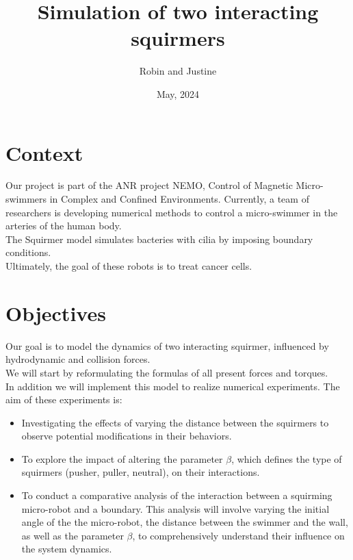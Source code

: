 \documentclass[options]{article}
\begin{document}
\title{Simulation of two interacting squirmers}
\author{Robin and Justine}
\date{May, 2024}
\maketitle

\section{Context}
Our project is part of the ANR project NEMO, Control of Magnetic Micro-swimmers in Complex and Confined Environments.
Currently, a team of researchers is developing numerical methods to control a micro-swimmer in the arteries
of the human body.\\
The Squirmer model simulates bacteries with cilia by imposing boundary conditions.\\
Ultimately, the goal of these robots is to treat cancer cells.\\

\vspace{0.5cm}
\section{Objectives}
Our goal is to model the dynamics of two interacting squirmer, influenced by hydrodynamic \cite{Brumley} and collision forces.\\
We will start by reformulating the formulas of all present forces and torques.\cite{Brumley}\cite{Lauga}\\
In addition we will implement this model to realize numerical experiments. The aim of these experiments is: 
\begin{itemize}
    \item Investigating the effects of varying the distance between the squirmers to observe
    potential modifications in their behaviors.
    \item To explore the impact of altering the parameter $\beta$, which defines the
    type of squirmers (pusher, puller, neutral), on their interactions.
    \item To conduct a comparative analysis of the interaction between a squirming micro-robot and a 
    boundary. This analysis will involve varying the initial angle of the the micro-robot, the distance between the swimmer and the wall, as well as the parameter $\beta$, 
    to comprehensively understand their influence on the system dynamics.
\end{itemize}
\end{document}
